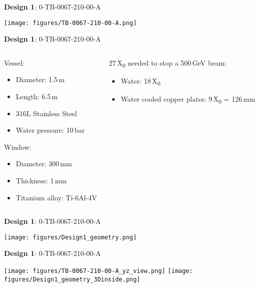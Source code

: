 \documentclass[xcolor={dvipsnames}]{beamer}
\begin{document}
\begin{frame}{\textbf{Design 1}: 0-TB-0067-210-00-A}
\begin{center}
  \texttt{[image: figures/TB-0067-210-00-A.png]}
\end{center}
\end{frame}
{
\begin{frame}{\textbf{Design 1}: 0-TB-0067-210-00-A}
\begin{columns}
 \begin{column}{0.5\textwidth}
  Vessel:
  \begin{itemize}
   \item Diameter: 1.5\,m
   \item Length: 6.5\,m
   \item 316L Stainless Steel
   \item Water pressure: 10\,bar
  \end{itemize}
  Window:
  \begin{itemize}
   \item Diameter: 300\,mm
   \item Thickness: 1\,mm
   \item Titanium alloy: Ti-6Al-4V 
  \end{itemize}
 \end{column}
 \begin{column}{0.5\textwidth}
  27\,X\textsubscript{0} needed to stop a 500\,GeV beam:
  \begin{itemize}
   \item Water: 18\,X\textsubscript{0}
   \item Water cooled copper plates: 9\,X\textsubscript{0} = 126\,mm
  \end{itemize}  
 \end{column}
\end{columns}

\end{frame}
}
\begin{frame}{\textbf{Design 1}: 0-TB-0067-210-00-A}
\begin{center}
 \texttt{[image: figures/Design1\_geometry.png]}
\end{center}
\end{frame}
\begin{frame}{\textbf{Design 1}: 0-TB-0067-210-00-A}
\begin{center}
 \texttt{[image: figures/TB-0067-210-00-A\_yz\_view.png]}
 \hfill
 \texttt{[image: figures/Design1\_geometry\_3Dinside.png]}
\end{center}
\end{frame}
\end{document}
